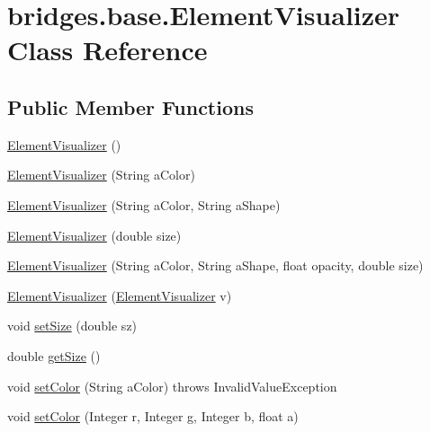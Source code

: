 \hypertarget{classbridges_1_1base_1_1_element_visualizer}{}\section{bridges.\+base.\+Element\+Visualizer Class Reference}
\label{classbridges_1_1base_1_1_element_visualizer}
\subsection*{Public Member Functions}
\begin{DoxyCompactItemize}
\item 
\hyperlink{classbridges_1_1base_1_1_element_visualizer_acbca874876ec1e8dbbde6484a4fc056e}{Element\+Visualizer} ()
\item 
\hyperlink{classbridges_1_1base_1_1_element_visualizer_a5c0d9fe8051ebc816372b9836689fdfa}{Element\+Visualizer} (String a\+Color)
\item 
\hyperlink{classbridges_1_1base_1_1_element_visualizer_ab62b1b06907fbeddfcee2b4b297e1021}{Element\+Visualizer} (String a\+Color, String a\+Shape)
\item 
\hyperlink{classbridges_1_1base_1_1_element_visualizer_ab32f66b72ccf0a26c03ba44006da9ac6}{Element\+Visualizer} (double size)
\item 
\hyperlink{classbridges_1_1base_1_1_element_visualizer_a9bf06ca1b6c215e079ab33ccd99633e8}{Element\+Visualizer} (String a\+Color, String a\+Shape, float opacity, double size)
\item 
\hyperlink{classbridges_1_1base_1_1_element_visualizer_a5b48cbda94a4e84e40de41fe156e2497}{Element\+Visualizer} (\hyperlink{classbridges_1_1base_1_1_element_visualizer}{Element\+Visualizer} v)
\item 
void \hyperlink{classbridges_1_1base_1_1_element_visualizer_aba410184f7df495594fc1fa7948335a5}{set\+Size} (double sz)
\item 
double \hyperlink{classbridges_1_1base_1_1_element_visualizer_a0b7673bf724e3df1f94df50ad95ca5b1}{get\+Size} ()
\item 
void \hyperlink{classbridges_1_1base_1_1_element_visualizer_ae24d6c51ba22481c3dbfc0dd512c0a32}{set\+Color} (String a\+Color)  throws Invalid\+Value\+Exception
\item 
void \hyperlink{classbridges_1_1base_1_1_element_visualizer_a84fad1c8abe43b20c68c1800d7630918}{set\+Color} (Integer r, Integer g, Integer b, float a)
\item 

\end{DoxyCompactItemize}
